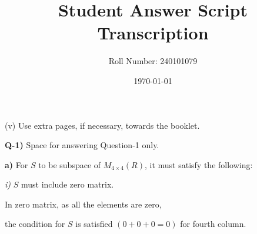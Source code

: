 \documentclass[12pt]{article}
\title{Student Answer Script Transcription}
\author{Roll Number: 240101079}
\date{\today}
\begin{document}
\maketitle

(v) Use extra pages, if necessary, towards the booklet.

\textbf{Q-1)} Space for answering Question-1 only.

\textbf{a)} For $S$ to be subspace of $M_{4\times4}(R)$, it must satisfy the following:

\textit{i)} $S$ must include zero matrix.

In zero matrix, as all the elements are zero,

the condition for $S$ is satisfied $(0+0+0=0)$ for fourth column.
\end{document}
